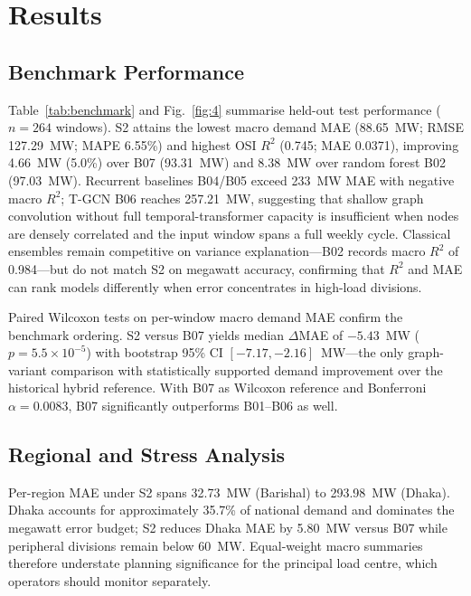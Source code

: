 \section{Results}\label{sec:results}

\subsection{Benchmark Performance}

Table~\ref{tab:benchmark} and Fig.~\ref{fig:4} summarise held-out test performance ($n{=}264$ windows). S2 attains the lowest macro demand MAE (88.65~MW; RMSE 127.29~MW; MAPE 6.55\%) and highest OSI $R^2$ (0.745; MAE 0.0371), improving 4.66~MW (5.0\%) over B07 (93.31~MW) and 8.38~MW over random forest B02 (97.03~MW). Recurrent baselines B04/B05 exceed 233~MW MAE with negative macro $R^2$; T-GCN B06 reaches 257.21~MW, suggesting that shallow graph convolution without full temporal-transformer capacity is insufficient when nodes are densely correlated and the input window spans a full weekly cycle. Classical ensembles remain competitive on variance explanation---B02 records macro $R^2$ of 0.984---but do not match S2 on megawatt accuracy, confirming that $R^2$ and MAE can rank models differently when error concentrates in high-load divisions.




Paired Wilcoxon tests on per-window macro demand MAE confirm the benchmark ordering. S2 versus B07 yields median $\Delta$MAE of $-5.43$~MW ($p{=}5.5{\times}10^{-5}$) with bootstrap 95\% CI $[-7.17, -2.16]$~MW---the only graph-variant comparison with statistically supported demand improvement over the historical hybrid reference. With B07 as Wilcoxon reference and Bonferroni $\alpha{=}0.0083$, B07 significantly outperforms B01--B06 as well.

\subsection{Regional and Stress Analysis}

Per-region MAE under S2 spans 32.73~MW (Barishal) to 293.98~MW (Dhaka). Dhaka accounts for approximately 35.7\% of national demand and dominates the megawatt error budget; S2 reduces Dhaka MAE by 5.80~MW versus B07 while peripheral divisions remain below 60~MW. Equal-weight macro summaries therefore understate planning significance for the principal load centre, which operators should monitor separately.

